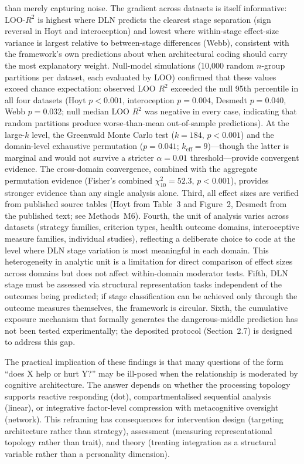 \documentclass[11pt]{article}
\begin{document}
than merely capturing noise. The gradient across datasets is itself
informative: LOO-$R^2$ is highest where DLN predicts the clearest
stage separation (sign reversal in Hoyt and interoception) and
lowest where within-stage effect-size variance is largest relative
to between-stage differences (Webb), consistent with the framework's
own predictions about when architectural coding should carry the most
explanatory weight. Null-model simulations (10,000 random $n$-group
partitions per dataset, each evaluated by LOO) confirmed that these
values exceed chance expectation: observed LOO $R^2$ exceeded the null
95th percentile in all four datasets (Hoyt $p < 0.001$, interoception
$p = 0.004$, Desmedt $p = 0.040$, Webb $p = 0.032$; null median LOO
$R^2$ was negative in every case, indicating that random partitions
produce worse-than-mean out-of-sample predictions).
At the large-$k$ level, the Greenwald Monte
Carlo test ($k = 184$, $p < 0.001$) and the domain-level exhaustive
permutation ($p = 0.041$; $k_\mathrm{eff} = 9$)---though the latter
is marginal and would not survive a stricter $\alpha = 0.01$
threshold---provide convergent evidence. The cross-domain convergence, combined with the aggregate
permutation evidence (Fisher's combined $\chi^2_{10} = 52.3$,
$p < 0.001$), provides stronger evidence than any single analysis
alone. Third, all effect sizes are verified from
published source tables (Hoyt from Table~3 and Figure~2, Desmedt
from the published text; see Methods~M6). Fourth, the unit of
analysis varies across datasets (strategy families, criterion types,
health outcome domains, interoceptive measure families, individual
studies),
reflecting a deliberate choice to code at the level where DLN stage
variation is most meaningful in each domain. This heterogeneity in
analytic unit is a limitation for direct comparison of effect sizes
across domains but does not affect within-domain moderator tests.
Fifth, DLN stage must be assessed via structural representation tasks
independent of the outcomes being predicted; if stage classification
can be achieved only through the outcome measures themselves, the
framework is circular. Sixth, the cumulative exposure mechanism that
formally generates the dangerous-middle prediction has not been tested
experimentally; the deposited protocol (Section~2.7) is designed to
address this gap.

The practical implication of these findings is that many questions of
the form ``does X help or hurt Y?'' may be ill-posed when the
relationship is moderated by cognitive architecture. The answer depends
on whether the processing topology supports reactive responding (dot),
compartmentalised sequential analysis (linear), or integrative
factor-level compression with metacognitive oversight (network). This
reframing has consequences for intervention design (targeting
architecture rather than strategy), assessment (measuring
representational topology rather than trait), and theory (treating
integration as a structural variable rather than a personality
dimension).
\end{document}
